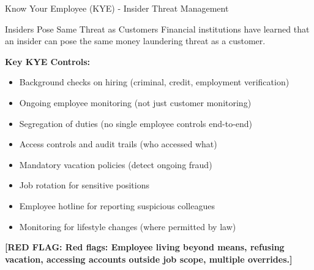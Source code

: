 \documentclass[11pt,a4paper]{beamer}
\newcommand{\redflag}[1]{\textcolor{red!80!black}{\textbf{[RED FLAG: #1]}}}
\begin{document}
	\begin{frame}{Know Your Employee (KYE) - Insider Threat Management}
		\begin{block}{Insiders Pose Same Threat as Customers}
			Financial institutions have learned that an insider can pose the same money laundering threat as a customer.
		\end{block}
		\textbf{Key KYE Controls:}
		\begin{itemize}
			\item Background checks on hiring (criminal, credit, employment verification)
			\item Ongoing employee monitoring (not just customer monitoring)
			\item Segregation of duties (no single employee controls end-to-end)
			\item Access controls and audit trails (who accessed what)
			\item Mandatory vacation policies (detect ongoing fraud)
			\item Job rotation for sensitive positions
			\item Employee hotline for reporting suspicious colleagues
			\item Monitoring for lifestyle changes (where permitted by law)
		\end{itemize}
		\redflag{Red flags: Employee living beyond means, refusing vacation, accessing accounts outside job scope, multiple overrides.}
	\end{frame}
	
\end{document}
